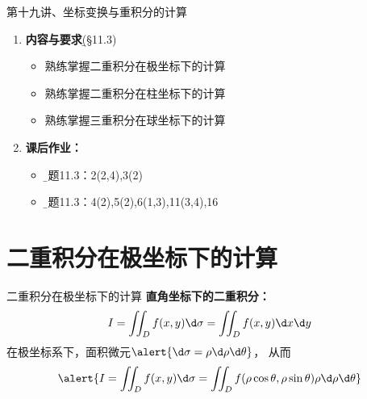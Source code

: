 
\begin{frame}{第十九讲、坐标变换与重积分的计算}
	\linespread{1.5}
	\begin{enumerate}
	  \item {\bf 内容与要求}{\b (\S 11.3)}
	  \begin{itemize}
		\item 熟练掌握二重积分在极坐标下的计算
		\item 熟练掌握二重积分在柱坐标下的计算
		\item 熟练掌握三重积分在球坐标下的计算
	  \vspace{1em}
	  \end{itemize}
	  \item {\bf  课后作业：}
	  \begin{itemize}
	    \item {\b 习题11.3：2(2,4),3(2)}
	    \item {\b 习题11.3：4(2),5(2),6(1,3),11(3,4),16}
	  \end{itemize}
	\end{enumerate}
\end{frame}

\section{二重积分在极坐标下的计算}

\begin{frame}{二重积分在极坐标下的计算}
	\linespread{1.2}\pause 
	{\bf 直角坐标下的二重积分：}
	$$I=\iint_Df(x,y)\d\sigma=\iint_Df(x,y)\d x\d y$$
	\pause 在极坐标系下，面积微元$\alert{\d\sigma=\rho \d\rho \d\theta}$，\pause 
	从而
	$$\alert{I=\iint_Df(x,y)\d\sigma=\iint_Df(\rho\cos\theta,\rho\sin\theta)
	\rho \d\rho \d\theta}$$
	\pause {}
\end{frame}

